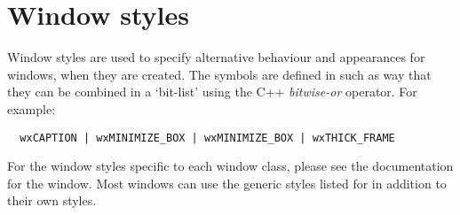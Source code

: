 \section{Window styles}\label{windowstyles}

Window styles are used to specify alternative behaviour and appearances for windows, when they are
created. The symbols are defined in such as way that they can be combined in a `bit-list' using the
C++ {\it bitwise-or} operator. For example:

\begin{verbatim}
  wxCAPTION | wxMINIMIZE_BOX | wxMINIMIZE_BOX | wxTHICK_FRAME
\end{verbatim}

For the window styles specific to each window class, please see the documentation
for the window. Most windows can use the generic styles listed for  in
addition to their own styles.

